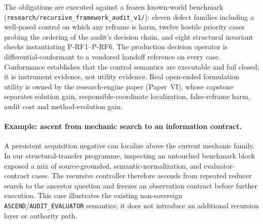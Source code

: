 The obligations are executed against a frozen known-world benchmark
(\texttt{research/recursive\_framework\_audit\_v1/}): eleven defect families including a
well-posed control on which any reframe is harm, twelve hostile priority cases probing the
ordering of the audit's decision chain, and eight structural invariant checks instantiating
P-RF1--P-RF6. The production decision operator is differential-conformant to a vendored
handoff reference on every case. Conformance establishes that the control semantics are
executable and fail closed; it is instrument evidence, not utility evidence. Real open-ended
formulation utility is owned by the research-engine paper (Paper~VI), whose capstone separates
solution gain, responsible-coordinate localization, false-reframe harm, audit cost and
method-evolution gain.

\paragraph{Example: ascent from mechanic search to an information contract.}
A persistent acquisition negative can localize above the current mechanic family.  In
our structural-transfer programme, inspecting an untouched benchmark block exposed a
mix of source-grounded, semantic-normalization, and evaluator-contract cases.  The
recursive controller therefore ascends from repeated reducer search to the ancestor
question and freezes an observation contract before further execution.  This case
illustrates the existing non-sovereign \texttt{ASCEND}/\texttt{AUDIT\_EVALUATOR}
semantics; it does not introduce an additional recursion layer or authority path.
